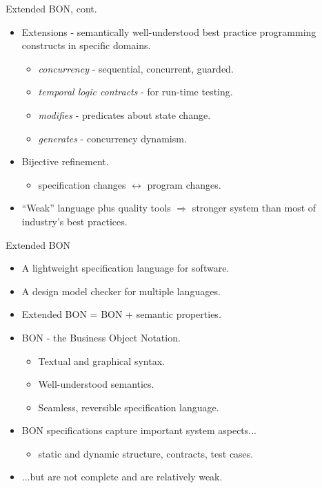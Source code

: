 \documentclass[%
final,
slideColor,
nototal,
nocolorBG,
pdf,
accumulate,
next,
]{prosper}
\begin{document}
\begin{slide}{Extended BON, cont.}
  \begin{small}
    \begin{itemize}
    \item Extensions - semantically well-understood best practice
      programming constructs in specific domains.
      \begin{itemize}
      \item \emph{concurrency} - sequential, concurrent, guarded.
      \item \emph{temporal logic contracts} - for run-time testing.
      \item \emph{modifies} - predicates about state change.
      \item \emph{generates} - concurrency dynamism.
      \end{itemize}
    \item Bijective refinement.
      \begin{itemize}
      \item specification changes $\leftrightarrow$ program changes.
      \end{itemize}
    \item ``Weak'' language plus quality tools $\Rightarrow$ \newline
      stronger system than most of industry's best practices.
    \end{itemize}
  \end{small}
\end{slide}

\begin{slide}{Extended BON}
  \begin{footnotesize}
    \begin{itemize}
    \item A lightweight specification language for software.
    \item A design model checker for multiple languages.
    \item Extended BON = BON + semantic properties.
    \item BON - the Business Object Notation.
      \begin{itemize}
      \item Textual and graphical syntax.
      \item Well-understood semantics.
      \item Seamless, reversible specification language.
      \end{itemize}
    \item BON specifications capture important system aspects...
      \begin{itemize}
      \item static and dynamic structure, contracts, test cases.
      \end{itemize}
    \item ...but are not complete and are relatively weak.
    \end{itemize}
  \end{footnotesize}
\end{slide}
\end{document}

